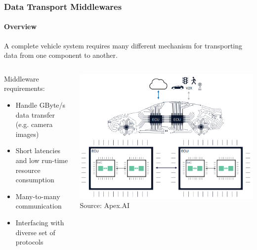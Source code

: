 \begin{frame}
\frametitle{Data Transport Middlewares}
\framesubtitle{Overview}
A complete vehicle system requires many different mechanism for transporting
data from one component to another.\\
\begin{columns}[]
    \begin{column}{0.6\textwidth}
        Middleware requirements:
        \begin{itemize}
            \item Handle GByte/s data transfer (e.g. camera images)
            \item Short latencies and low run-time resource consumption
            \item Many-to-many communication
            \item Interfacing with diverse set of protocols
        \end{itemize}
    \end{column}
    \begin{column}{0.4\textwidth}
        \centering
        \includegraphics[width=\textwidth]{images/apex_vehicle_coms.png}\\
        \scriptsize Source: Apex.AI
    \end{column}
\end{columns}
\end{frame}

